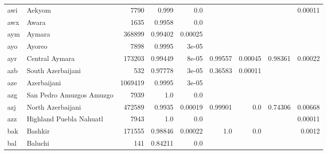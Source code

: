 \documentclass[11pt]{article}
\begin{document}
\begin{table*}[h]
{\begin{tabular}{llrrrrrrr}
awi         & Aekyom         & 7790         & 0.999         & 0.0         &          &          &          & 0.00011         \\

awx         & Awara         & 1635         & 0.9958         & 0.0         &          &          &          &          \\

aym         & Aymara         & 368899         & 0.99402         & 0.00025         &          &          &          &          \\

ayo         & Ayoreo         & 7898         & 0.9995         & 3e-05         &          &          &          &          \\

ayr         & Central Aymara         & 173203         & 0.99449         & 8e-05         & 0.99557         & 0.00045         & 0.98361         & 0.00022         \\

azb         & South Azerbaijani         & 532         & 0.97778         & 3e-05         & 0.36583         & 0.00011         &          &          \\

aze         & Azerbaijani         & 1069419         & 0.9995         & 3e-05         &          &          &          &          \\

azg         & San Pedro Amuzgos Amuzgo         & 7939         & 1.0         & 0.0         &          &          &          &          \\

azj         & North Azerbaijani         & 472589         & 0.9935         & 0.00019         & 0.99901         & 0.0         & 0.74306         & 0.00668         \\

azz         & Highland Puebla Nahuatl         & 7943         & 1.0         & 0.0         &          &          &          & 0.00011         \\

bak         & Bashkir         & 171555         & 0.98846         & 0.00022         & 1.0         & 0.0         &          & 0.0012         \\

bal         & Baluchi         & 141         & 0.84211         & 0.0         &          &          &          &          \\


\end{tabular}}
\end{table*}
\end{document}

